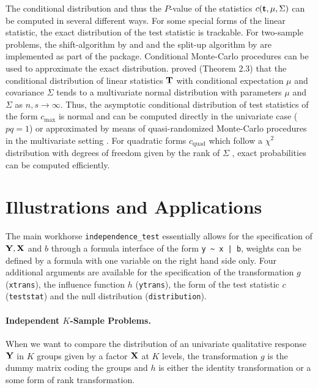 \documentclass[letter]{article}
\begin{document}
The conditional distribution and thus the $P$-value
of the statistics $c(\mathbf{t}, \mu, \Sigma)$ can be
computed in several different ways. For some special forms of the
linear statistic, the exact distribution of the test statistic is trackable.
For two-sample problems, the shift-algorithm by \cite{axact-dist:1986} 
and \cite{exakte-ver:1987} and the split-up algorithm by 
\cite{vdWiel2001} are implemented as part of the package.
Conditional Monte-Carlo procedures can be used to approximate the exact
distribution. \cite{StrasserWeber1999} proved (Theorem 2.3) that the   
conditional distribution of linear statistics $\mathbf{T}$ with conditional    
expectation $\mu$ and covariance $\Sigma$ tends to a multivariate normal
distribution with parameters $\mu$ and $\Sigma$ as $n, s \rightarrow
\infty$. Thus, the asymptotic conditional distribution of test statistics of
the
form $c_\text{max}$ is normal and
can be computed directly in the univariate case ($pq = 1$)
or approximated by means of quasi-randomized Monte-Carlo  
procedures in the multivariate setting \citep{numerical-:1992}. For
quadratic forms
$c_\text{quad}$ which follow a $\chi^2$ distribution with degrees of freedom 
given by the rank of $\Sigma$ \citep[Theorem 6.20, ][]{Rasch1995}, exact
probabilities can be computed efficiently.

\section{Illustrations and Applications}

The main workhorse \texttt{independence\_test} essentially allows for the
specification of $\mathbf{Y}, \mathbf{X}$ and $b$ through a formula interface of the form
\verb/y ~ x | b/, weights can be defined by a formula with one variable on
the right hand side only. Four additional arguments are available for the
specification of the transformation $g$ (\texttt{xtrans}), the influence 
function $h$ (\texttt{ytrans}), the form of the test statistic $c$ 
(\texttt{teststat}) and the null distribution (\texttt{distribution}).

\paragraph{Independent $K$-Sample Problems.}

When we want to compare the distribution of an univariate qualitative response 
$\mathbf{Y}$ in $K$ groups given by a factor $\mathbf{X}$ at $K$ levels, the transformation 
$g$ is the dummy matrix coding the groups and $h$ is either the identity
transformation or a some form of rank transformation.
\end{document}
